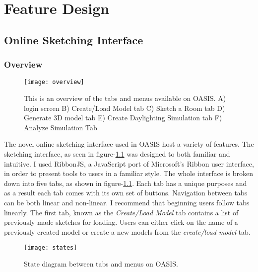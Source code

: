 \chapter{Feature Design} \label{sec:introduction}

\section{Online Sketching Interface}

	\subsection{Overview}

		\begin{figure}[t]
		\centering
		\texttt{[image: overview]}
		\caption{This is an overview of the tabs and menus available on OASIS. 
		A) login screen 
		B) Create/Load Model tab
		C) Sketch a Room tab
		D) Generate 3D model tab
		E) Create Daylighting Simulation tab
		F) Analyze Simulation Tab}
		\label{fig:overview}
		\end{figure}

		The novel online sketching interface used in OASIS host a variety of features.
		The sketching interface, as seen in figure-\ref{fig:overview} was designed to both familiar and intuitive.
		I used RibbonJS, a JavaScript port of Microsoft's Ribbon user interface, in order to present tools to users in a familiar style\cite{ribbonjs}. 
		The whole interface is broken down into five tabs, as shown in figure-\ref{fig:overview}.
		Each tab has a unique purposes and as a result each tab comes with its own set of buttons.
		Navigation between tabs can be both linear and non-linear. I recommend that beginning users follow tabs linearly. 
		The first tab, known as the \textit{Create/Load Model} tab contains a list of previously made sketches for loading.
		Users can either click on the name of a previously created model or create a new models from the \textit{create/load model} tab.\\

		\begin{figure}[t]
		\centering
		\texttt{[image: states]}
		\caption{State diagram between tabs and menus on OASIS.}
		\label{fig:states}
		\end{figure}


